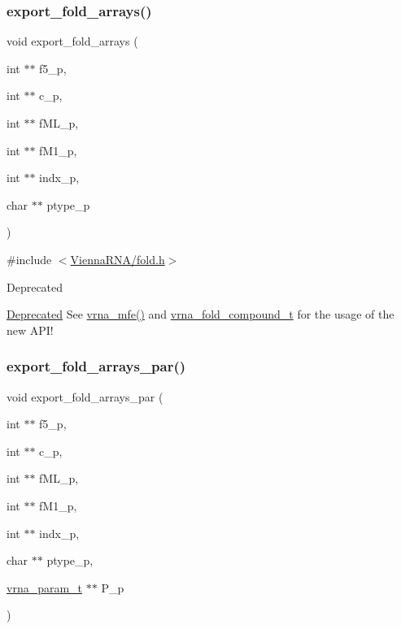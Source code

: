 \subsubsection{\texorpdfstring{export\+\_\+fold\+\_\+arrays()}{export\_fold\_arrays()}}
{\footnotesize\ttfamily void export\+\_\+fold\+\_\+arrays (\begin{DoxyParamCaption}\item[{int $\ast$$\ast$}]{f5\+\_\+p,  }\item[{int $\ast$$\ast$}]{c\+\_\+p,  }\item[{int $\ast$$\ast$}]{f\+M\+L\+\_\+p,  }\item[{int $\ast$$\ast$}]{f\+M1\+\_\+p,  }\item[{int $\ast$$\ast$}]{indx\+\_\+p,  }\item[{char $\ast$$\ast$}]{ptype\+\_\+p }\end{DoxyParamCaption})}



{\ttfamily \#include $<$\hyperlink{fold_8h}{Vienna\+R\+N\+A/fold.\+h}$>$}

\begin{DoxyRefDesc}{Deprecated}
\item[\hyperlink{deprecated__deprecated000074}{Deprecated}]See \hyperlink{group__mfe__fold_gabd3b147371ccf25c577f88bbbaf159fd}{vrna\+\_\+mfe()} and \hyperlink{group__fold__compound_ga1b0cef17fd40466cef5968eaeeff6166}{vrna\+\_\+fold\+\_\+compound\+\_\+t} for the usage of the new A\+P\+I!\end{DoxyRefDesc}
\mbox{\label{group__mfe__fold__single_ga6606ec0ec964ea506fdadb997a1a5328}} 
\subsubsection{\texorpdfstring{export\+\_\+fold\+\_\+arrays\+\_\+par()}{export\_fold\_arrays\_par()}}
{\footnotesize\ttfamily void export\+\_\+fold\+\_\+arrays\+\_\+par (\begin{DoxyParamCaption}\item[{int $\ast$$\ast$}]{f5\+\_\+p,  }\item[{int $\ast$$\ast$}]{c\+\_\+p,  }\item[{int $\ast$$\ast$}]{f\+M\+L\+\_\+p,  }\item[{int $\ast$$\ast$}]{f\+M1\+\_\+p,  }\item[{int $\ast$$\ast$}]{indx\+\_\+p,  }\item[{char $\ast$$\ast$}]{ptype\+\_\+p,  }\item[{\hyperlink{group__energy__parameters_ga8a69ca7d787e4fd6079914f5343a1f35}{vrna\+\_\+param\+\_\+t} $\ast$$\ast$}]{P\+\_\+p }\end{DoxyParamCaption})}




